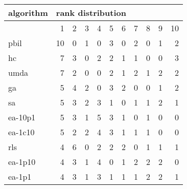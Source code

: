\begin{tabular}{@{}l*{10}{r}@{}}
\toprule
algorithm & \multicolumn{10}{l}{{rank distribution}}\\
\midrule
& 1 & 2 & 3 & 4 & 5 & 6 & 7 & 8 & 9 & 10\\
\midrule
pbil & 10 & 0 & 1 & 0 & 3 & 0 & 2 & 0 & 1 & 2\\
hc & 7 & 3 & 0 & 2 & 2 & 1 & 1 & 0 & 0 & 3\\
umda & 7 & 2 & 0 & 0 & 2 & 1 & 2 & 1 & 2 & 2\\
ga & 5 & 4 & 2 & 0 & 3 & 2 & 0 & 0 & 1 & 2\\
sa & 5 & 3 & 2 & 3 & 1 & 0 & 1 & 1 & 2 & 1\\
ea-10p1 & 5 & 3 & 1 & 5 & 3 & 1 & 0 & 1 & 0 & 0\\
ea-1c10 & 5 & 2 & 2 & 4 & 3 & 1 & 1 & 1 & 0 & 0\\
rls & 4 & 6 & 0 & 2 & 2 & 2 & 0 & 1 & 1 & 1\\
ea-1p10 & 4 & 3 & 1 & 4 & 0 & 1 & 2 & 2 & 2 & 0\\
ea-1p1 & 4 & 3 & 1 & 3 & 1 & 1 & 1 & 2 & 2 & 1\\
\bottomrule
\end{tabular}
